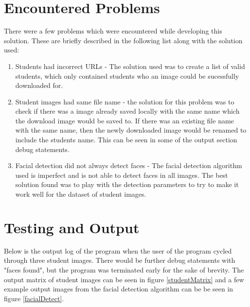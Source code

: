 \documentclass[12pt, letterpaper, final, onecolumn, titlepage] {article}
\begin{document}
\pagebreak
\section{Encountered Problems}
There were a few problems which were encountered while developing this solution. These are briefly described in the following list along with the solution used:
\begin{enumerate}
	\item Students had incorrect URLs - The solution used was to create a list of valid students, which only contained students who an image could be sucessfully downloaded for.
	\item Student images had same file name - the solution for this problem was to check if there was a image already saved locally with the same name which the download image would be saved to. If there was an existing file name with the same name, then the newly downloaded image would be renamed to include the students name. This can be seen in some of the output section debug statements.
	\item Facial detection did not always detect faces - The facial detection algorithm used is imperfect and is not able to detect faces in all images. The best solution found was to play with the detection parameters to try to make it work well for the dataset of student images.
\end{enumerate}

\pagebreak
\section{Testing and Output}
Below is the output log of the program when the user of the program cycled through three student images. There would be further debug statements with "faces found", but the program was terminated early for the sake of brevity. The output matrix of student images can be seen in figure \ref{studentMatrix} and a few example output images from the facial detection algorithm can be be seen in figure \ref{facialDetect}.
\end{document}
